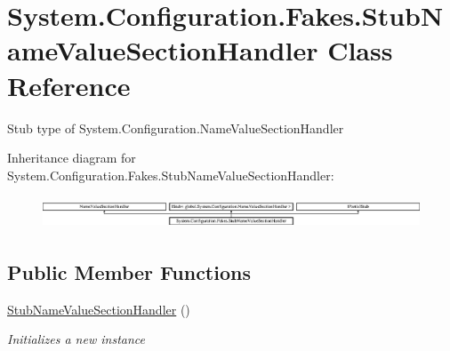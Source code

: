 \hypertarget{class_system_1_1_configuration_1_1_fakes_1_1_stub_name_value_section_handler}{\section{System.\-Configuration.\-Fakes.\-Stub\-Name\-Value\-Section\-Handler Class Reference}
\label{class_system_1_1_configuration_1_1_fakes_1_1_stub_name_value_section_handler}
}


Stub type of System.\-Configuration.\-Name\-Value\-Section\-Handler 


Inheritance diagram for System.\-Configuration.\-Fakes.\-Stub\-Name\-Value\-Section\-Handler\-:\begin{figure}[H]
\begin{center}
\leavevmode
\includegraphics[height=0.967185cm]{class_system_1_1_configuration_1_1_fakes_1_1_stub_name_value_section_handler}
\end{center}
\end{figure}
\subsection*{Public Member Functions}
\begin{DoxyCompactItemize}
\item 
\hyperlink{class_system_1_1_configuration_1_1_fakes_1_1_stub_name_value_section_handler_a05a8efffd93224d278f2d0af9a324443}{Stub\-Name\-Value\-Section\-Handler} ()
\begin{DoxyCompactList}\small\item\em Initializes a new instance\end{DoxyCompactList}\end{DoxyCompactItemize}
